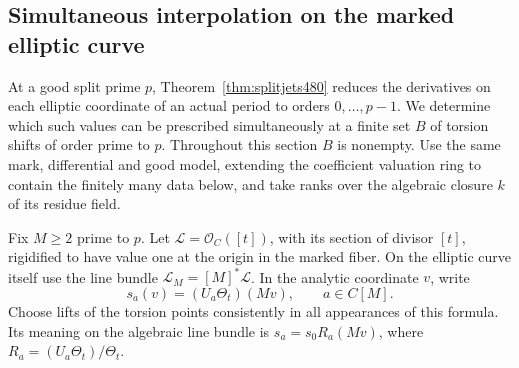 \documentclass[a4paper,11pt]{article}
\theoremstyle{definition}
\theoremstyle{remark}
\numberwithin{equation}{section}
\begin{document}
\subsection{Simultaneous interpolation on the marked elliptic curve}
\label{sec:shiftedjets481}

At a good split prime \(p\), Theorem~\ref{thm:splitjets480}
reduces the derivatives on each elliptic coordinate of an actual
period to orders \(0,\ldots,p-1\). We determine which such
values can be prescribed simultaneously at a finite set \(B\)
of torsion shifts of order prime to \(p\). Throughout this
section \(B\) is nonempty. Use the same mark, differential and
good model, extending the coefficient valuation ring to contain
the finitely many data below, and take ranks over the algebraic
closure \(k\) of its residue field.

Fix \(M\ge2\) prime to \(p\). Let \(\mathcal L=\mathcal O_C([t])\),
with its section of divisor \([t]\), rigidified to have value one
at the origin in the marked fiber. On the elliptic curve itself
use the line bundle \(\mathcal L_M=[M]^*\mathcal L\).
In the analytic coordinate \(v\), write
\[
             s_a(v)=(U_a\Theta_t)(Mv),\qquad a\in C[M].
\]
Choose lifts of the torsion points consistently in all appearances
of this formula. Its meaning on the algebraic line bundle is
\(s_a=s_0 R_a(Mv)\), where \(R_a=(U_a\Theta_t)/\Theta_t\).
\end{document}
